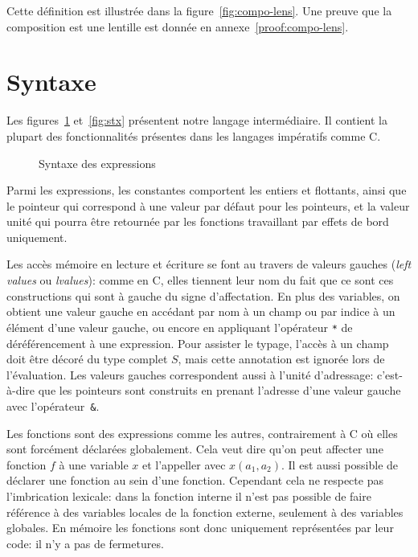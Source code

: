 Cette définition est illustrée dans la figure~\ref{fig:compo-lens}. Une preuve
que la composition est une lentille est donnée en annexe~\ref{proof:compo-lens}.

\section{Syntaxe}

Les figures~\ref{fig:stx-data} et~\ref{fig:stx} présentent
notre langage intermédiaire. Il contient la plupart des fonctionnalités
présentes dans les langages impératifs comme C.

\begin{figure}%

  \figstxdata{}

  \caption{Syntaxe des expressions}
\label{fig:stx-data}
\end{figure}%

Parmi les expressions, les constantes comportent les entiers et flottants, ainsi
que le pointeur \eNull qui correspond à une valeur par défaut pour les
pointeurs, et la valeur unité \eUnit qui pourra être retournée par les fonctions
travaillant par effets de bord uniquement.

Les accès mémoire en lecture et écriture se font au travers de valeurs gauches
(\emph{left values} ou \emph{lvalues}): comme en C, elles tiennent leur nom du
fait que ce sont ces constructions qui sont à gauche du signe d'affectation. En plus
des variables, on obtient une valeur gauche en accédant par nom à un champ ou par
indice à un élément d'une valeur gauche, ou encore en appliquant l'opérateur
\texttt{*} de déréférencement à une expression. Pour assister le typage, l'accès
à un champ doit être décoré du type complet $S$, mais cette annotation est
ignorée lors de l'évaluation. Les valeurs gauches correspondent aussi à l'unité
d'adressage: c'est-à-dire que les pointeurs sont construits en prenant l'adresse
d'une valeur gauche avec l'opérateur~\texttt{\&}.

Les fonctions sont des expressions comme les autres, contrairement à C où elles
sont forcément déclarées globalement. Cela veut dire qu'on peut affecter une
fonction $f$ à une variable $x$ et l'appeller avec $x(a_1, a_2)$. Il est aussi
possible de déclarer une fonction au sein d'une fonction. Cependant cela ne
respecte pas l'imbrication lexicale: dans la fonction interne il n'est pas
possible de faire référence à des variables locales de la fonction externe,
seulement à des variables globales. En mémoire les fonctions sont donc
uniquement représentées par leur code: il n'y a pas de fermetures.

